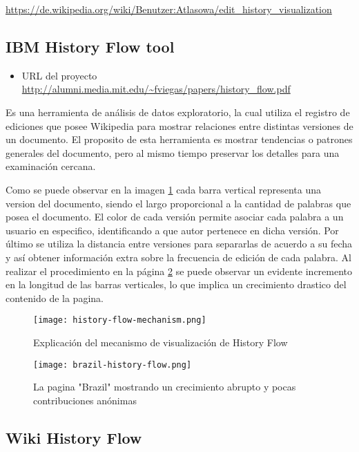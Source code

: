 \url{https://de.wikipedia.org/wiki/Benutzer:Atlasowa/edit_history_visualization}

\subsection{IBM History Flow tool}

\begin{itemize}
    \item URL del proyecto \url{http://alumni.media.mit.edu/~fviegas/papers/history_flow.pdf}
\end{itemize}

Es una herramienta de análisis de datos exploratorio, la cual utiliza el registro de ediciones que posee Wikipedia para mostrar relaciones entre distintas versiones de un documento. El proposito de esta herramienta es mostrar tendencias o patrones generales del documento, pero al mismo tiempo preservar los detalles para una examinación cercana.

Como se puede observar en la imagen \ref*{fig:history-flow-mechanism} cada barra vertical representa una version del documento, siendo el largo proporcional a la cantidad de palabras que posea el documento. El color de cada versión permite asociar cada palabra a un usuario en especifico, identificando a que autor pertenece en dicha versión. Por último se utiliza la distancia entre versiones para separarlas de acuerdo a su fecha y así obtener información extra sobre la frecuencia de edición de cada palabra. Al realizar el procedimiento en la página  \ref*{fig:brazil-history-flow} se puede observar un evidente incremento en la longitud de las barras verticales, lo que implica un crecimiento drastico del contenido de la pagina.

\begin{figure}[H]
    \texttt{[image: history-flow-mechanism.png]}
    \caption{Explicación del mecanismo de visualización de History Flow}
    \label{fig:history-flow-mechanism}
\end{figure}

\begin{figure}[H]
    \texttt{[image: brazil-history-flow.png]}
    \caption{La pagina "Brazil" mostrando un crecimiento abrupto y pocas contribuciones anónimas}
    \label{fig:brazil-history-flow}
\end{figure}

\subsection{Wiki History Flow}

